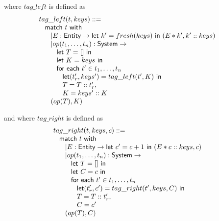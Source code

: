 \documentclass{article}[12pt,a4paper]
\theoremstyle{definition}
\begin{document}
where $tag\_left$ is defined as
\[
  \begin{array}{l}
    tag\_left(t, keys) ::=\\
    \hspace{2ex}\mathsf{match}~t~\mathsf{with}\\
    \hspace{4ex}| E: \mathsf{Entity} \rightarrow \mathsf{let}~k'=fresh(keys)~\mathsf{in}~
    (E*k',k'::keys)\\
    \hspace{4ex}| op(t_1,\ldots,t_n): \mathsf{System} \rightarrow \\
    \hspace{6ex} \mathsf{let}~T=[]~\mathsf{in}\\
    \hspace{6ex} \mathsf{let}~K=keys~\mathsf{in}\\
    \hspace{6ex} \mathsf{for~each}~t'\in t_1,\ldots,t_n\\
    \hspace{8ex} \mathsf{let}(t'_r, keys') = tag\_left(t', K)~\mathsf{in}\\
    \hspace{8ex} T = T :: t'_r,\\
    \hspace{8ex} K = keys' :: K\\
    \hspace{4ex} (op(T), K)

  \end{array}
\]

and where $tag\_right$ is defined as
\[
  \begin{array}{l}
    tag\_right(t, keys, c) ::=\\
    \hspace{2ex}\mathsf{match}~t~\mathsf{with}\\
    \hspace{4ex}| E: \mathsf{Entity} \rightarrow \mathsf{let}~c'=c+1~\mathsf{in}~
    (E*c::keys,c)\\
    \hspace{4ex}| op(t_1,\ldots,t_n): \mathsf{System} \rightarrow \\
    \hspace{6ex} \mathsf{let}~T=[]~\mathsf{in}\\
    \hspace{6ex} \mathsf{let}~C=c~\mathsf{in}\\
    \hspace{6ex} \mathsf{for~each}~t'\in t_1,\ldots,t_n\\
    \hspace{8ex} \mathsf{let}(t'_r, c') = tag\_right(t', keys, C)~\mathsf{in}\\
    \hspace{8ex} T = T :: t'_r,\\
    \hspace{8ex} C = c'\\
    \hspace{4ex} (op(T), C)

  \end{array}
\]
\end{document}
